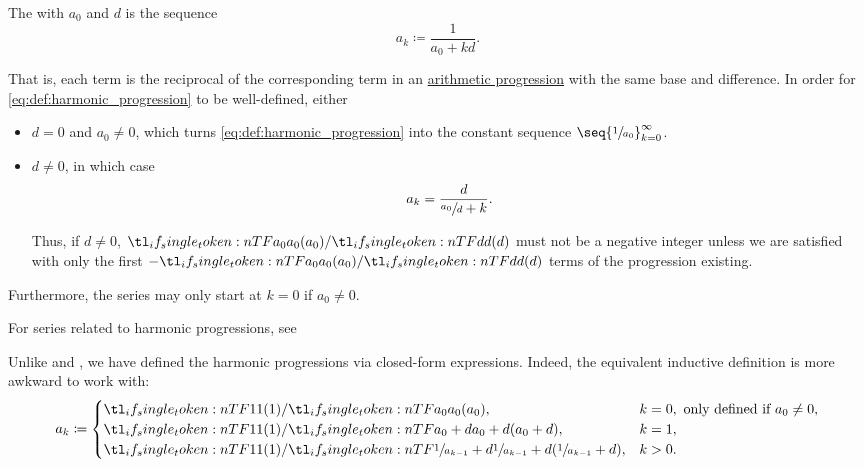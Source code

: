 \begin{definition}\label{def:harmonic_progression}
  The  with  \( a_0 \) and  \( d \) is the sequence
  \begin{equation}\label{eq:def:harmonic_progression}
    a_k \coloneqq \frac 1 {a_0 + kd}.
  \end{equation}

  That is, each term is the reciprocal of the corresponding term in an \hyperref[def:arithmetic_progression]{arithmetic progression} with the same base and difference. In order for \eqref{eq:def:harmonic_progression} to be well-defined, either
  \begin{itemize}
    \item \( d = 0 \) and \( a_0 \neq 0 \), which turns \eqref{eq:def:harmonic_progression} into the constant sequence \( \seq{ \sfrac 1 {a_0} }_{k=0}^\infty \).
    \item \( d \neq 0 \), in which case
    \begin{equation*}
      a_k = \frac d {\sfrac {a_0} d + k}.
    \end{equation*}

    Thus, if \( d \neq 0 \), \( \ifrac {a_0} d \) must not be a negative integer unless we are satisfied with only the first \( -\ifrac {a_0} d \) terms of the progression existing.
  \end{itemize}

  Furthermore, the series may only start at \( k = 0 \) if \( a_0 \neq 0 \).

  For series related to harmonic progressions, see 
\end{definition}

\begin{remark}\label{rem:harmonic_progression_recursive_form}
  Unlike  and , we have defined the harmonic progressions via closed-form expressions. Indeed, the equivalent inductive definition is more awkward to work with:
  \begin{equation*}
    a_k \coloneqq \begin{cases}
      \ifrac 1 {a_0},                    & k = 0, \text{ only defined if } a_0 \neq 0, \\
      \ifrac 1 {a_0 + d},                & k = 1,                                      \\
      \ifrac 1 {\sfrac 1 {a_{k-1}} + d}, & k > 0.
    \end{cases}
  \end{equation*}
\end{remark}
